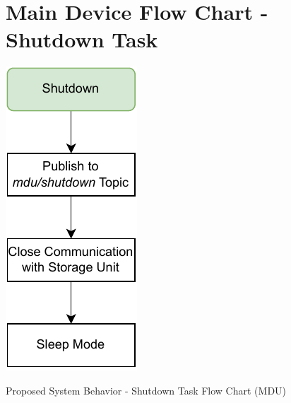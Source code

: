 
\chapter{Main Device Flow Chart - Shutdown Task} %

\label{AppendixD}

\begin{algorithm}[H]
    \centering
    \includegraphics[scale=1]{appendices/assets/MDU_SHUTDOWN.pdf}
    \caption{Proposed System Behavior - Shutdown Task Flow Chart (MDU)}
    \label{alg:MDU_SHUTDOWN}
\end{algorithm}

